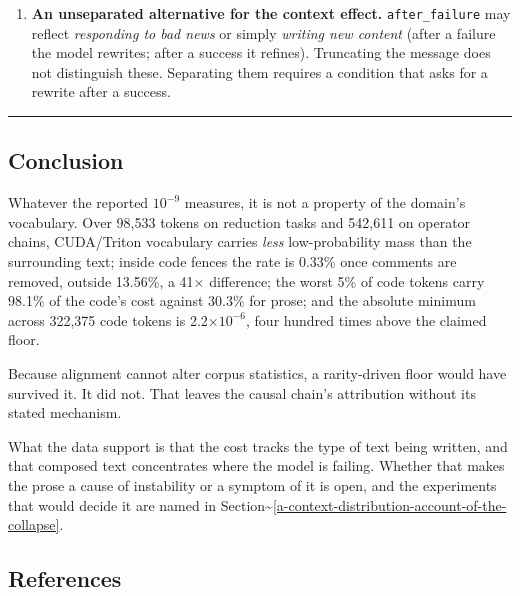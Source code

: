 \documentclass[
  11pt,
]{article}
\begin{document}
\begin{enumerate}
  content (tracebacks, shell commands) are counted as code; we did not
  enumerate how many. Comments inside code blocks are also counted as
  code, which biases the code-side rate \emph{upward};
  Section\textasciitilde{}\ref{rq2-spatial-distribution-of-the-probability-cost}
  quantifies the effect (0.60\% → 0.33\%) rather than leaving it as a
  caveat.
\item
  \textbf{An unseparated alternative for the context effect.}
  \texttt{after\_failure} may reflect \emph{responding to bad news} or
  simply \emph{writing new content} (after a failure the model rewrites;
  after a success it refines). Truncating the message does not
  distinguish these. Separating them requires a condition that asks for
  a rewrite after a success.
\end{enumerate}

\begin{center}\rule{0.5\linewidth}{0.5pt}\end{center}

\hypertarget{conclusion}{%
\subsection{Conclusion}\label{conclusion}}

Whatever the reported \(10^{-9}\) measures, it is not a property of the
domain's vocabulary. Over 98,533 tokens on reduction tasks and 542,611
on operator chains, CUDA/Triton vocabulary carries \emph{less}
low-probability mass than the surrounding text; inside code fences the
rate is 0.33\% once comments are removed, outside 13.56\%, a 41×
difference; the worst 5\% of code tokens carry 98.1\% of the code's cost
against 30.3\% for prose; and the absolute minimum across 322,375 code
tokens is 2.2×\(10^{-6}\), four hundred times above the claimed floor.

Because alignment cannot alter corpus statistics, a rarity-driven floor
would have survived it. It did not. That leaves the causal chain's
attribution without its stated mechanism.

What the data support is that the cost tracks the type of text being
written, and that composed text concentrates where the model is failing.
Whether that makes the prose a cause of instability or a symptom of it
is open, and the experiments that would decide it are named in
Section\textasciitilde{}\ref{a-context-distribution-account-of-the-collapse}.

\hypertarget{references}{%
\subsection{References}\label{references}}
\end{document}
